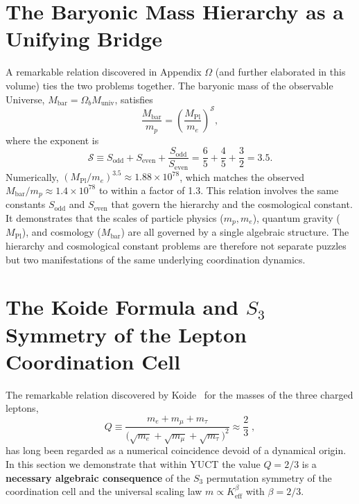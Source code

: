 \documentclass[12pt,a4paper]{article}
\begin{document}
	\section{The Baryonic Mass Hierarchy as a Unifying Bridge}
	
	A remarkable relation discovered in Appendix $\Omega$ (and further elaborated in this volume) ties the two problems together. The baryonic mass of the observable Universe, $M_{\mathrm{bar}} = \Omega_b M_{\mathrm{univ}}$, satisfies
	\begin{equation}
		\frac{M_{\mathrm{bar}}}{m_p} = \left( \frac{M_{\mathrm{Pl}}}{m_e} \right)^{\mathcal{S}},
		\label{eq:baryon-hierarchy}
	\end{equation}
	where the exponent is
	\begin{equation}
		\mathcal{S} \equiv S_{\mathrm{odd}} + S_{\mathrm{even}} + \frac{S_{\mathrm{odd}}}{S_{\mathrm{even}}} = \frac{6}{5} + \frac{4}{5} + \frac{3}{2} = 3.5.
	\end{equation}
	Numerically, $(M_{\mathrm{Pl}}/m_e)^{3.5} \approx 1.88 \times 10^{78}$, which matches the observed $M_{\mathrm{bar}}/m_p \approx 1.4 \times 10^{78}$ to within a factor of 1.3. This relation involves the same constants $S_{\mathrm{odd}}$ and $S_{\mathrm{even}}$ that govern the hierarchy and the cosmological constant. It demonstrates that the scales of particle physics ($m_p, m_e$), quantum gravity ($M_{\mathrm{Pl}}$), and cosmology ($M_{\mathrm{bar}}$) are all governed by a single algebraic structure. The hierarchy and cosmological constant problems are therefore not separate puzzles but two manifestations of the same underlying coordination dynamics.
	
\section{The Koide Formula and $S_3$ Symmetry of the Lepton Coordination Cell}
\label{sec:koide}

The remarkable relation discovered by Koide~\cite{Koide1983} for the masses of
the three charged leptons,
\begin{equation}
	Q \equiv \frac{m_e + m_\mu + m_\tau}{\bigl(\sqrt{m_e} + \sqrt{m_\mu} + \sqrt{m_\tau}\bigr)^2}
	\approx \frac{2}{3}\;,
\end{equation}
has long been regarded as a numerical coincidence devoid of a dynamical origin.
In this section we demonstrate that within YUCT the value $Q=2/3$ is a
\textbf{necessary algebraic consequence} of the $S_3$ permutation symmetry of
the coordination cell and the universal scaling law $m \propto K_{\mathrm{eff}}^{\beta}$
with $\beta=2/3$.
\end{document}
